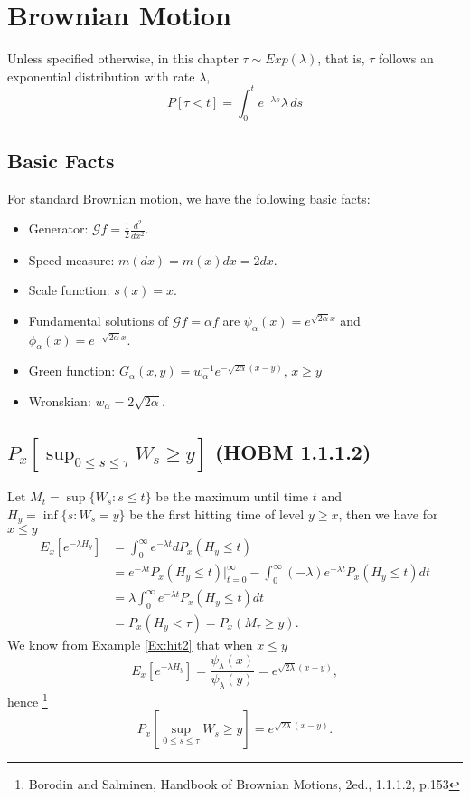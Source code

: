 \chapter{Brownian Motion}

Unless specified otherwise, in this chapter $\tau \sim Exp(\lambda)$, that is,
$\tau$ follows an exponential distribution with rate $\lambda$,
\[
  P[\tau<t] = \int_0^t e^{-\lambda s} \lambda \, ds
\]

\section{Basic Facts}
For standard Brownian motion, we have the following basic facts:
\begin{itemize}
  \item Generator: $\mathcal{G} f = \frac{1}{2} \frac{d^2}{dx^2}$.
  \item Speed measure: $m(dx)=m(x)dx=2 dx$.
  \item Scale function: $s(x)=x$.
  \item Fundamental solutions of $\mathcal{G} f = \alpha f$ are
    $\psi_{\alpha}(x)=e^{\sqrt{2\alpha} x}$ and
    $\phi_{\alpha}(x)=e^{-\sqrt{2\alpha} x}$.
  \item Green function: $G_{\alpha}(x,y)=w_{\alpha}^{-1} e^{-\sqrt{2\alpha}(x-y)}$, 
	$x\ge y$
  \item Wronskian: $w_{\alpha}=2\sqrt{2\alpha}$.
\end{itemize}

\section{ $P_x[ \sup_{0\le s\le \tau} W_s \ge y ]$ (HOBM 1.1.1.2) }
Let $M_t = \sup\{W_s: s\le t \}$ be the maximum until time $t$ and 
$H_y=\inf\{s:W_s=y \}$ be the first hitting time of level $y\ge x$,
then we have for $x\le y$
\begin{align*}
	E_x[e^{-\lambda H_y}] 
	&= \int_0^{\infty} e^{-\lambda t} dP_x(H_y\le t)  \\
	&= e^{-\lambda t} P_x(H_y\le t) |_{t=0}^{\infty} 
	   - \int_0^{\infty} (-\lambda) e^{-\lambda t} P_x(H_y\le t) dt  \\
	&= \lambda \int_0^{\infty} e^{-\lambda t} P_x(H_y\le t) dt  \\
	&= P_x(H_y<\tau) = P_x(M_{\tau}\ge y).
\end{align*}
We know from Example \ref{Ex:hit2} that when $x\le y$
\[
  E_x[e^{-\lambda H_y}]
    =\frac{\psi_{\lambda}(x)}{\psi_{\lambda}(y)}
    = e^{\sqrt{2\lambda}(x-y)},
\]
hence
\footnote{Borodin and Salminen, Handbook of Brownian Motions, 2ed., 1.1.1.2,
p.153}
\begin{equation}
  P_x[ \sup_{0\le s\le \tau} W_s \ge y ] = e^{\sqrt{2\lambda}(x-y)}.
\end{equation}


